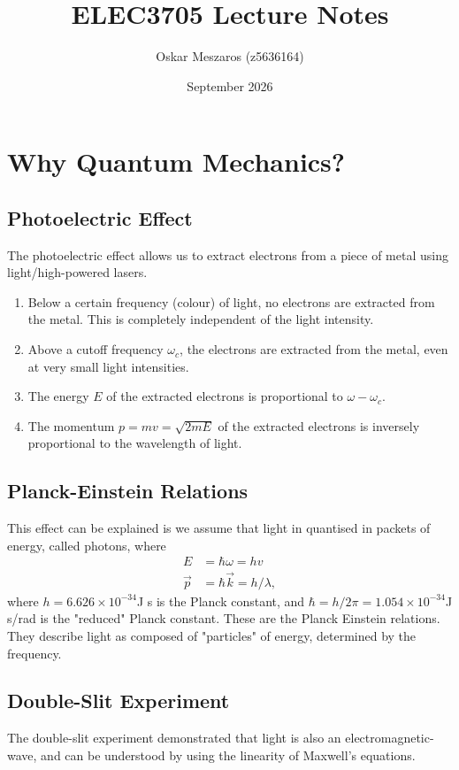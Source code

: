 \documentclass{article}
\begin{document}
\title{ELEC3705 Lecture Notes}
\author{Oskar Meszaros (z5636164)}
\date{September 2026}

\maketitle
\tableofcontents

\newpage
\section{Why Quantum Mechanics?}
\subsection{Photoelectric Effect}
The photoelectric effect allows us to extract electrons from a piece of metal using light/high-powered lasers.
\begin{enumerate}
    \item Below a certain frequency (colour) of light, no electrons are extracted from the metal. This is completely independent of the light intensity.
    \item Above a cutoff frequency $\omega _c$, the electrons are extracted from the metal, even at very small light intensities.
    \item The energy $E$ of the extracted electrons is proportional to $\omega -\omega _c$.
    \item The momentum $p=mv=\sqrt{2mE}$ of the extracted electrons is inversely proportional to the wavelength of light.
\end{enumerate}

\subsection{Planck-Einstein Relations}
This effect can be explained is we assume that light in quantised in packets of energy, called photons, where
\begin{align*}
    E &= \hbar \omega =hv \\
    \vec{p}&=\hbar \vec{k} = h/\lambda ,
\end{align*}
where $h=6.626\times 10^{-34}$J s is the Planck constant, and $\hbar =h/2\pi =1.054\times 10^{-34}$J s/rad is the "reduced" Planck constant. These are the Planck Einstein relations. They describe light as composed of "particles" of energy, determined by the frequency.

\subsection{Double-Slit Experiment}
The double-slit experiment demonstrated that light is also an electromagnetic-wave, and can be understood by using the linearity of Maxwell's equations.
\end{document}
